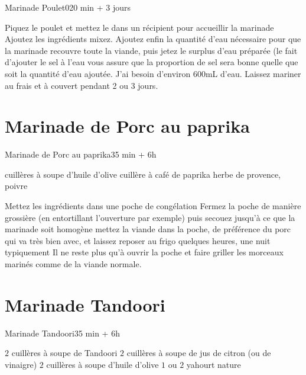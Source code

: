 {\begin{recette}{Marinade Poulet}{0}{20 min + 3 jours}{}
\begin{preparation}
\etape Piquez le poulet et mettez le dans un récipient pour accueillir la marinade
\etape Ajoutez les ingrédients mixez. 
\etape Ajoutez enfin la quantité d'eau nécessaire pour que la marinade recouvre toute la viande, puis jetez le surplus d'eau préparée (le fait d'ajouter le sel à l'eau vous assure que la proportion de sel sera bonne quelle que soit la quantité d'eau ajoutée. J'ai besoin d'environ 600mL d'eau. 
\etape Laissez mariner au frais et à couvert pendant 2 ou 3 jours. 
\end{preparation}
\end{recette}


\section{Marinade de Porc au paprika}
\begin{recette}{Marinade de Porc au paprika}{3}{5 min + 6h}{}
\begin{ingredients}
 cuillères à soupe d'huile d'olive
 cuillère à café de paprika
\ingredient herbe de provence, poivre
\end{ingredients}

\begin{preparation}
\etape Mettez les ingrédients dans une poche de congélation
\etape Fermez la poche de manière grossière (en entortillant l'ouverture par exemple) puis secouez jusqu'à ce que la marinade 
soit homogène
\etape mettez la viande dans la poche, de préférence du porc qui va très bien avec, et laissez reposer au frigo quelques heures, 
une nuit typiquement
\etape Il ne reste plus qu'à ouvrir la poche et faire griller les morceaux marinés comme de la viande normale.
\end{preparation}

\end{recette}

\section{Marinade Tandoori}
\begin{recette}{Marinade Tandoori}{3}{5 min + 6h}{}
\begin{ingredients}
\ingredient $2$ cuillères à soupe de Tandoori
\ingredient $2$ cuillères à soupe de jus de citron (ou de vinaigre)
\ingredient $2$ cuillères à soupe d'huile d'olive
\ingredient $1$ ou $2$ yahourt nature
\end{ingredients}


\end{recette}}
